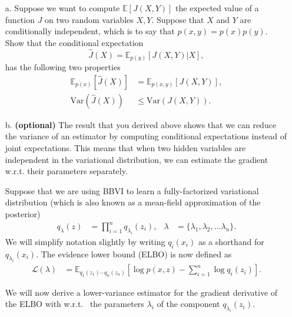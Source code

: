 \documentclass [12pt]{article}
\newcommand{\E}{\ensuremath{\mathbb{E}}}
\begin{document}
\begin{itemize}
\item[a.] Suppose we want to compute $\E\left[ J(X,Y) \right]$ the expected value of a function $J$ on two random variables $X, Y$. Suppose that $X$ and $Y$ are conditionally independent, which is to say that $p(x,y) = p(x)p(y)$. Show that the conditional expectation 
\[
	\hat{J}(X) = \E_{p(y)}\left[ J(X,Y) | X \right],
\]
has the following two properties
\begin{align*}
	\E_{p(x)}\left[ \hat{J}(X)\right] 
    &= \E_{p(x,y)}\left[J(X,Y) \right],
    \\
    \text{Var}(\hat{J}(X)) 
    &\leq \text{Var}(J(X,Y)).
\end{align*}

\item[b.] \textbf{(optional)} The result that you derived above shows that we can reduce the variance of an estimator by computing conditional expectations instead of joint expectations. This means that when two hidden variables are independent in the variational distribution, we can estimate the gradient w.r.t. their parameters separately.

Suppose that we are using BBVI to learn a fully-factorized variational distribution (which is also known as a mean-field approximation of the posterior) 
\begin{align*} 
	q_{\lambda}(z) 
    &= 
    \prod_{i=1}^{n}q_{\lambda_{i}}(z_{i}),
   &
   \lambda 
   &= 
   \{ 
     \lambda_{1}, \lambda_{2}, \ldots \lambda_{n} 
   \}.
\end{align*}
We will simplify notation slightly by writing $q_{i}(x_i)$ as a shorthand for $q_{\lambda_{i}}(x_i)$. The evidence lower bound (ELBO) is now defined as
\begin{align}
	\mathcal{L}(\lambda)
	&= 
    \E_{q_{1}(z_{1})\cdots q_{n}(z_{n})}
    \left[
    	\log p(x,z) - \sum_{i=1}^{n} \log q_{i}(z_{i}) 
    \right].
\end{align}

We will now derive a lower-variance estimator for the gradient derivative of the ELBO with w.r.t. ~the parameters
$\lambda_{i}$ of the component $q_{\lambda_i}(z_i)$. 


\end{itemize}
\end{document}
